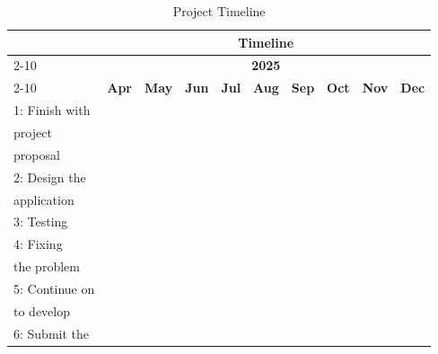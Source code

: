 \begin{table}[!ht]
	\footnotesize
	\sloppy
	\centering
	\caption{Project Timeline}
	\label{tab: your-table} %
	\begin{tabular}{|p{2.15cm}|c|c|c|c|c|c|c|c|c|}
		\hline
		\multicolumn{1}{|c|}{}& \multicolumn{9}{c|}{\textbf{Timeline}} \\ \cline{2-10} 
		\multicolumn{1}{|c|}{}& \multicolumn{9}{c|}{\textbf{2025}}  \\ \cline{2-10} 
		\multicolumn{1}{|c|}{\multirow{-3}{2cm}{\textbf{Plan}}} & \textbf{Apr} & \textbf{May} & \textbf{Jun} & \textbf{Jul} & \textbf{Aug} & \textbf{Sep} & \textbf{Oct} & \textbf{Nov} & \textbf{Dec}  \\ \hline
		
		1: Finish with  & \cellcolor[HTML]{000000}
		& & & & & & & & 
		\\ \hspace{0.8em}
		project & \cellcolor[HTML]{000000} 
		& & & & & & & &
		\\ \hspace{0.8em}
		proposal & \cellcolor[HTML]{000000} 
		& & & & & & & & \\ \hline
		
		2: Design the  & &  \cellcolor[HTML]{000000} 
		&\cellcolor[HTML]{000000} 
		& & & & & &
		\\ \hspace{0.8em}
		application & &  \cellcolor[HTML]{000000} 
		& \cellcolor[HTML]{000000}
		& & & & & & \\ \hline
		
		3: Testing & & & & \cellcolor[HTML]{000000}
		&  \cellcolor[HTML]{000000} 
		& & & &  \\ \hline
		
		4: Fixing & & & & & &\cellcolor[HTML]{000000}
		& & & 
		\\ \hspace{0.8em}
		the problem & & & & & &\cellcolor[HTML]{000000}
		& & &  \\ \hline
		
		5: Continue on & & & & & & & \cellcolor[HTML]{000000}
		& \cellcolor[HTML]{000000}
		& 
		\\ \hspace{0.8em}
		to develop  & & & & & & & \cellcolor[HTML]{000000}
		& \cellcolor[HTML]{000000}
		& 
		\\\hline
		
		6: Submit the & & &  & & & & & &  \cellcolor[HTML]{000000} \\ \hline
	\end{tabular}
\end{table}